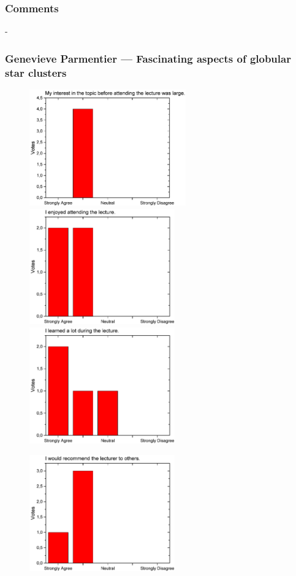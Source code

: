 \subsubsection*{Comments}
-


\clearpage
\subsubsection{Genevieve Parmentier  --- Fascinating aspects of globular star clusters }
\begin{figure}[h!]
  \centering
  \begin{minipage}{.48\linewidth}
    \centering
      {\includegraphics[height=50mm]{figures/n/Graph31.pdf}}
      {\includegraphics[height=50mm]{figures/n/Graph32.pdf}}
      {\includegraphics[height=50mm]{figures/n/Graph33.pdf}}
  \end{minipage}\quad
  \begin{minipage}{.48\linewidth}
    \centering
      {\includegraphics[height=50mm]{figures/n/Graph34.pdf}}

\end{minipage}
\end{figure}
